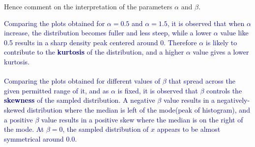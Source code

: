 \documentclass[12pt]{article}
\begin{document}
\begin{enumerate}
Hence comment on the interpretation of the parameters $\alpha$ and $\beta$.

\textcolor{darkblue}{
    Comparing the plots obtained for $\alpha=0.5$ and $\alpha=1.5$, it is observed that when $\alpha$ increase, the distribution becomes fuller and less steep, while a lower $\alpha$ value like 0.5 results in a sharp density peak centered around 0. Therefore $\alpha$ is likely to contribute to the \textbf{kurtosis} of the distribution, and a higher $\alpha$ value gives a lower kurtosis.\\
    \\
    Comparing the plots obtained for different values of $\beta$ that spread across the given permitted range of it, and as $\alpha$ is fixed, it is observed that $\beta$ controls the \textbf{skewness} of the sampled distribution. 
    A negative $\beta$ value results in a negatively-skewed distribution where the median is left of the mode(peak of histogram), and a positive $\beta$ value results in a positive skew where the median is on the right of the mode. At $\beta=0$, the sampled distribution of $x$ appears to be almost symmetrical around 0.0.
}

\end{enumerate}
\end{document}
